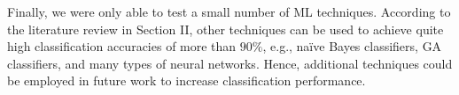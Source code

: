 \documentclass[conference]{IEEEtran}
\begin{document}
Finally, we were only able to test a small number of ML techniques. According to the literature review in Section II, other techniques can be used to achieve quite high classification accuracies of more than \(90\%\), e.g., na\"{i}ve Bayes classifiers, GA classifiers, and many types of neural networks. Hence, additional techniques could be employed in future work to increase classification performance.





\end{document}
